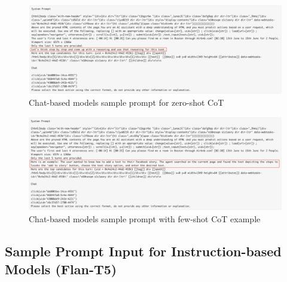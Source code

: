 \documentclass[11pt]{article}
\begin{document}
\clearpage
\begin{figure}[ht]
\includegraphics[width=\textwidth]{prompt_samples/Chat-zero-shot-sample.png}
\caption{Chat-based models sample prompt for zero-shot CoT}\label{fig:fig11}
\centering
\end{figure}

\begin{figure}[ht]
\includegraphics[width=\textwidth]{prompt_samples/Chat-few-shot-sample.png}
\caption{Chat-based models sample prompt with few-shot CoT example}\label{fig:fig12}
\centering
\end{figure}

\clearpage

\subsection{Sample Prompt Input for Instruction-based Models (Flan-T5)}
\end{document}
